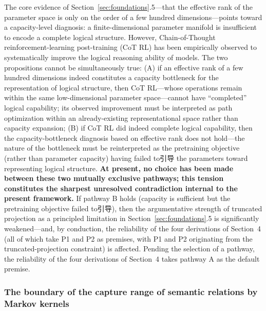 \documentclass[11pt,a4paper]{article}
\theoremstyle{definition}
\begin{document}
The core evidence of Section~\ref{sec:foundations}.5---that the effective rank of the parameter space is only on the order of a few hundred dimensions---points toward a capacity-level diagnosis: a finite-dimensional parameter manifold is insufficient to encode a complete logical structure. However, Chain-of-Thought reinforcement-learning post-training (CoT RL) has been empirically observed to systematically improve the logical reasoning ability of models. The two propositions cannot be simultaneously true: (A) if an effective rank of a few hundred dimensions indeed constitutes a capacity bottleneck for the representation of logical structure, then CoT RL---whose operations remain within the same low-dimensional parameter space---cannot have ``completed'' logical capability; its observed improvement must be interpreted as path optimization within an already-existing representational space rather than capacity expansion; (B) if CoT RL did indeed complete logical capability, then the capacity-bottleneck diagnosis based on effective rank does not hold---the nature of the bottleneck must be reinterpreted as the pretraining objective (rather than parameter capacity) having failed to引导 the parameters toward representing logical structure. \textbf{At present, no choice has been made between these two mutually exclusive pathways; this tension constitutes the sharpest unresolved contradiction internal to the present framework.} If pathway B holds (capacity is sufficient but the pretraining objective failed to引导), then the argumentative strength of truncated projection as a principled limitation in Section~\ref{sec:foundations}.5 is significantly weakened---and, by conduction, the reliability of the four derivations of Section~4 (all of which take P1 and P2 as premises, with P1 and P2 originating from the truncated-projection constraint) is affected. Pending the selection of a pathway, the reliability of the four derivations of Section~4 takes pathway A as the default premise.

\subsubsection{The boundary of the capture range of semantic relations by Markov kernels}
\end{document}
